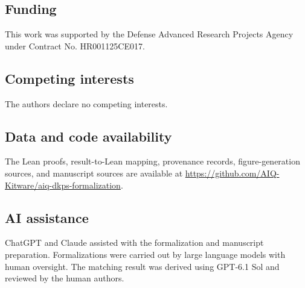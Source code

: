 \documentclass[pdflatex]{sn-jnl} %
\newif\ifDKAnonymous
\theoremstyle{thmstyleone}
\begin{document}
\subsection*{Funding}
\ifDKAnonymous
Funding information is omitted for anonymous review.
\else
This work was supported by the Defense Advanced Research Projects Agency
under Contract No. HR001125CE017.
\fi

\subsection*{Competing interests}
The authors declare no competing interests.

\subsection*{Data and code availability}
\ifDKAnonymous
Artifact information is omitted for anonymous review.
\else
The Lean proofs, result-to-Lean mapping, provenance records, figure-generation
sources, and manuscript sources are available at
\url{https://github.com/AIQ-Kitware/aiq-dkps-formalization}.
\fi

\subsection*{AI assistance}
ChatGPT and Claude assisted with the formalization and manuscript preparation.
Formalizations were carried out by large language models with human oversight.
The matching result was derived using GPT-6.1 Sol and reviewed by the human
  authors.



\clearpage
\appendix


\end{document}
